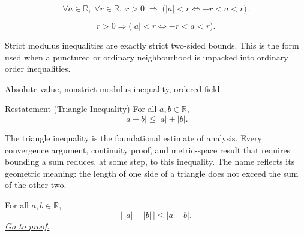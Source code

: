\begin{remark*}
\[
  \forall a \in \mathbb{R},\;
  \forall r \in \mathbb{R},\;
  r > 0 \;\Rightarrow\;
  \bigl(\lvert a \rvert < r \iff -r < a < r\bigr).
\]
\end{remark*}

\begin{remark*}
\[
r>0\Rightarrow \bigl(|a|<r\Longleftrightarrow -r<a<r\bigr).
\]
\end{remark*}

\begin{remark*}[Interpretation]
Strict modulus inequalities are exactly strict two-sided bounds. This is the
form used when a punctured or ordinary neighbourhood is unpacked into
ordinary order inequalities.
\end{remark*}

\begin{dependencies}
\hyperref[def:absolute-value]{Absolute value},
\hyperref[thm:absolute-value-le-iff]{nonstrict modulus inequality},
\hyperref[def:real-ordered-field]{ordered field}.
\end{dependencies}


\begin{restatementbox}{Restatement (Triangle Inequality)}
For all $a, b \in \mathbb{R}$,
\[
  \lvert a + b \rvert \le \lvert a \rvert + \lvert b \rvert.
\]

The triangle inequality is the foundational estimate of analysis.  Every
convergence argument, continuity proof, and metric-space result that
requires bounding a sum reduces, at some step, to this inequality.  The
name reflects its geometric meaning: the length of one side of a triangle
does not exceed the sum of the other two.
\end{restatementbox}


\begin{theorem}
\label{thm:reverse-triangle-inequality}
For all $a, b \in \mathbb{R}$,
\[
  \lvert\, \lvert a \rvert - \lvert b \rvert \,\rvert
  \le \lvert a - b \rvert.
\]
\hyperref[prf:reverse-triangle-inequality]{\textit{Go to proof.}}
\end{theorem}



